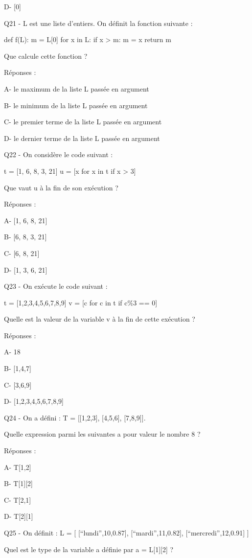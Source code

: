 \documentclass[
]{book}
\begin{document}
D- {[}0{]}

Q21 - L est une liste d'entiers. On définit la fonction suivante :

def f(L):
m = L{[}0{]}
for x in L:
if x \textgreater{} m:
m = x
return m

Que calcule cette fonction ?

Réponses :

A- le maximum de la liste L passée en argument

B- le minimum de la liste L passée en argument

C- le premier terme de la liste L passée en argument

D- le dernier terme de la liste L passée en argument

Q22 - On considère le code suivant :

t = {[}1, 6, 8, 3, 21{]}
u = {[}x for x in t if x \textgreater{} 3{]}

Que vaut u à la fin de son exécution ?

Réponses :

A- {[}1, 6, 8, 21{]}

B- {[}6, 8, 3, 21{]}

C- {[}6, 8, 21{]}

D- {[}1, 3, 6, 21{]}

Q23 - On exécute le code suivant :

t = {[}1,2,3,4,5,6,7,8,9{]}
v = {[}c for c in t if c\%3 == 0{]}

Quelle est la valeur de la variable v à la fin de cette exécution ?

Réponses :

A- 18

B- {[}1,4,7{]}

C- {[}3,6,9{]}

D- {[}1,2,3,4,5,6,7,8,9{]}

Q24 - On a défini : T = {[}{[}1,2,3{]}, {[}4,5,6{]}, {[}7,8,9{]}{]}.

Quelle expression parmi les suivantes a pour valeur le nombre 8 ?

Réponses :

A- T{[}1,2{]}

B- T{[}1{]}{[}2{]}

C- T{[}2,1{]}

D- T{[}2{]}{[}1{]}

Q25 - On définit :
L = {[} {[}``lundi'',10,0.87{]}, {[}``mardi'',11,0.82{]}, {[}``mercredi'',12,0.91{]} {]}

Quel est le type de la variable a définie par a = L{[}1{]}{[}2{]} ?
\end{document}
